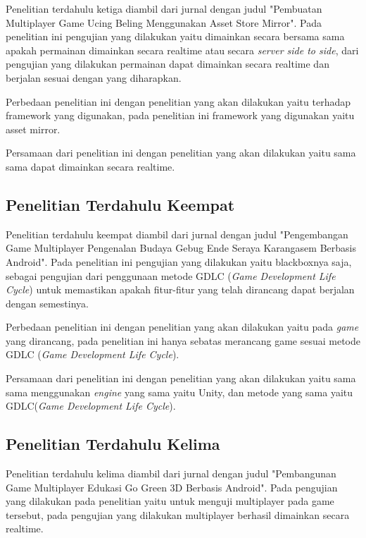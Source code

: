 Penelitian terdahulu ketiga diambil dari jurnal dengan judul "Pembuatan Multiplayer Game Ucing Beling Menggunakan Asset Store Mirror". Pada penelitian ini pengujian yang dilakukan yaitu dimainkan secara bersama sama apakah permainan dimainkan secara realtime atau secara \textit{server side to side}, dari pengujian yang dilakukan permainan dapat dimainkan secara realtime dan berjalan sesuai dengan yang diharapkan.

Perbedaan penelitian ini dengan penelitian yang akan dilakukan yaitu terhadap framework yang digunakan, pada penelitian ini framework yang digunakan yaitu asset mirror.

Persamaan dari penelitian ini dengan penelitian yang akan dilakukan yaitu sama sama dapat dimainkan secara realtime.

\subsection{Penelitian Terdahulu Keempat}
\noindent

Penelitian terdahulu keempat diambil dari jurnal dengan judul "Pengembangan Game Multiplayer Pengenalan Budaya Gebug Ende Seraya Karangasem Berbasis Android". Pada penelitian ini pengujian yang dilakukan yaitu blackboxnya saja, sebagai pengujian dari penggunaan metode GDLC (\textit{Game Development Life Cycle}) untuk memastikan apakah fitur-fitur yang telah dirancang dapat berjalan dengan semestinya.

Perbedaan penelitian ini dengan penelitian yang akan dilakukan yaitu pada \textit{game} yang dirancang, pada penelitian ini hanya sebatas merancang game sesuai metode GDLC (\textit{Game Development Life Cycle}).

Persamaan dari penelitian ini dengan penelitian yang akan dilakukan yaitu sama sama menggunakan \textit{engine} yang sama yaitu Unity, dan metode yang sama yaitu GDLC(\textit{Game Development Life Cycle}).

\subsection{Penelitian Terdahulu Kelima}
\noindent

Penelitian terdahulu kelima diambil dari jurnal dengan judul "Pembangunan Game Multiplayer Edukasi Go Green 3D Berbasis Android". Pada pengujian yang dilakukan pada penelitian yaitu untuk menguji multiplayer pada game tersebut, pada pengujian yang dilakukan multiplayer berhasil dimainkan secara realtime.

